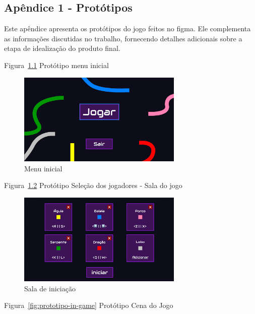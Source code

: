 \begin{apendicesenv}

\partapendices

\chapter{Apêndice 1 - Protótipos}

Este apêndice apresenta os protótipos do jogo feitos no figma. Ele complementa as informações discutidas no trabalho, fornecendo detalhes adicionais sobre a etapa de idealização do produto final.

Figura~\ref{fig:prototipo-menu} Protótipo menu inicial

\begin{figure}[htbp]
    \centering
    \caption{Menu inicial}
    \label{fig:prototipo-menu}
    \includegraphics[width=0.7\textwidth]{figuras/prototipo-menu.png}
\end{figure}

Figura~\ref{fig:prototipo-lobby} Protótipo Seleção dos jogadores - Sala do jogo

\begin{figure}[htbp]
    \centering
    \caption{Sala de iniciação}
    \label{fig:prototipo-lobby}
    \includegraphics[width=0.7\textwidth]{figuras/prototipo-lobby.png}
\end{figure}

Figura~\ref{fig:prototipo-in-game} Protótipo Cena do Jogo


\end{apendicesenv}
